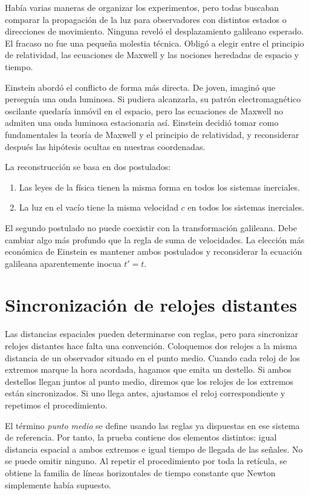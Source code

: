 Había varias maneras de organizar los experimentos, pero todas buscaban comparar la propagación de la luz para observadores con distintos estados o direcciones de movimiento. Ninguna reveló el desplazamiento galileano esperado. El fracaso no fue una pequeña molestia técnica. Obligó a elegir entre el principio de relatividad, las ecuaciones de Maxwell y las nociones heredadas de espacio y tiempo.

Einstein abordó el conflicto de forma más directa. De joven, imaginó que perseguía una onda luminosa. Si pudiera alcanzarla, su patrón electromagnético oscilante quedaría inmóvil en el espacio, pero las ecuaciones de Maxwell no admiten una onda luminosa estacionaria así. Einstein decidió tomar como fundamentales la teoría de Maxwell y el principio de relatividad, y reconsiderar después las hipótesis ocultas en nuestras coordenadas.

La reconstrucción se basa en dos postulados:
\begin{enumerate}
\item Las leyes de la física tienen la misma forma en todos los sistemas inerciales.
\item La luz en el vacío tiene la misma velocidad \(c\) en todos los sistemas inerciales.
\end{enumerate}

El segundo postulado no puede coexistir con la transformación galileana. Debe cambiar algo más profundo que la regla de suma de velocidades. La elección más económica de Einstein es mantener ambos postulados y reconsiderar la ecuación galileana aparentemente inocua \(t'=t\).

\section{Sincronización de relojes distantes}

Las distancias espaciales pueden determinarse con reglas, pero para sincronizar relojes distantes hace falta una convención. Coloquemos dos relojes a la misma distancia de un observador situado en el punto medio. Cuando cada reloj de los extremos marque la hora acordada, hagamos que emita un destello. Si ambos destellos llegan juntos al punto medio, diremos que los relojes de los extremos están sincronizados. Si uno llega antes, ajustamos el reloj correspondiente y repetimos el procedimiento.

El término \emph{punto medio} se define usando las reglas ya dispuestas en ese sistema de referencia. Por tanto, la prueba contiene dos elementos distintos: igual distancia espacial a ambos extremos e igual tiempo de llegada de las señales. No se puede omitir ninguno. Al repetir el procedimiento por toda la retícula, se obtiene la familia de líneas horizontales de tiempo constante que Newton simplemente había supuesto.

